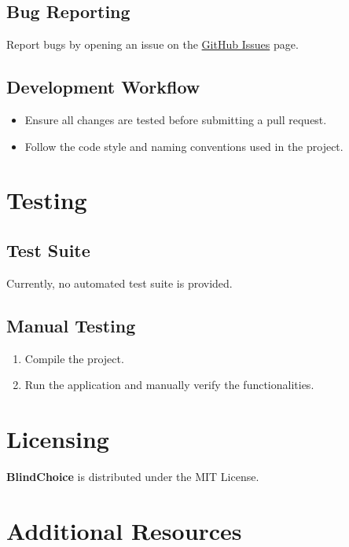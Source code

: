 \documentclass{article}
\begin{document}
\subsection{Bug Reporting}

Report bugs by opening an issue on the \href{https://github.com/Libra232/BlindChoice/issues}{GitHub Issues} page.


\subsection{Development Workflow}

\begin{itemize}
    \item Ensure all changes are tested before submitting a pull request.
    \item Follow the code style and naming conventions used in the project.
\end{itemize}



\section{Testing}


\subsection{Test Suite}

Currently, no automated test suite is provided.


\subsection{Manual Testing}

\begin{enumerate}
    \item Compile the project.
    \item Run the application and manually verify the functionalities.
\end{enumerate}



\section{Licensing}


\textbf{BlindChoice} is distributed under the MIT License.



\section{Additional Resources}
\end{document}

